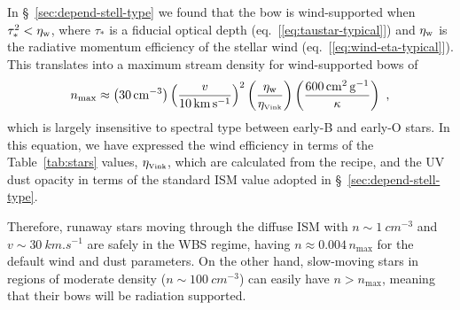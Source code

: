 In \S~\ref{sec:depend-stell-type} we found that the bow is
wind-supported when \(\tau_*^2 < \eta_{\text{w}}\), where \(\tau_*\) is a fiducial
optical depth (eq.~[\ref{eq:taustar-typical}]) and \(\eta_{\text{w}}\) is the
radiative momentum efficiency of the stellar wind
(eq.~[\ref{eq:wind-eta-typical}]).  This translates into a maximum
stream density for wind-supported bows of
\newcommand\crit{\ensuremath{_{\text{max}}}}
\newcommand\vink{\ensuremath{_{\text{\tiny Vink}}}}
\begin{equation}
  \label{eq:ncrit}
  n\crit \approx \left(\SI{30}{cm^{-3}}\right)
  \left(  \frac{v} {\SI{10}{km.s^{-1}}}\right)^2
  \left( \frac{\eta\wind}{\eta\vink} \right)
  \left( \frac{\SI{600}{cm^2.g^{-1}}}{\kappa} \right)
  \ ,
\end{equation}
which is largely insensitive to spectral type between early-B and
early-O stars.  In this equation, we have expressed the wind
efficiency in terms of the Table~\ref{tab:stars} values,
\(\eta\vink\), which are calculated from the \citet{Vink:2000a} recipe,
and the UV dust opacity in terms of the standard ISM value adopted in
\S~\ref{sec:depend-stell-type}.

Therefore, runaway stars moving through the diffuse ISM with
\(n \sim \SI{1}{cm^{-3}}\) and \(v \sim \SI{30}{km.s^{-1}}\) are safely in
the WBS regime, having \(n \approx \num{0.004}\, n\crit\) for the default
wind and dust parameters.  On the other hand, slow-moving stars in
\hii{} regions of moderate density (\(n \sim \SI{100}{cm^{-3}}\)) can
easily have \(n > n\crit\), meaning that their bows will be radiation
supported.

